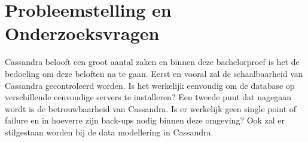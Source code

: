 \section{Probleemstelling en Onderzoeksvragen}
\label{sec:onderzoeksvragen}


Cassandra belooft een groot aantal zaken en binnen deze bachelorproef is het de bedoeling om deze beloften na te gaan.
Eerst en vooral zal de schaalbaarheid van Cassandra gecontroleerd worden.
Is het werkelijk eenvoudig om de database op verschillende eenvoudige servers te installeren?
Een tweede punt dat nagegaan wordt is de betrouwbaarheid van Cassandra.
Is er werkelijk geen single point of failure en in hoeverre zijn back-ups nodig binnen deze omgeving?
Ook zal er stilgestaan worden bij de data modellering in Cassandra.